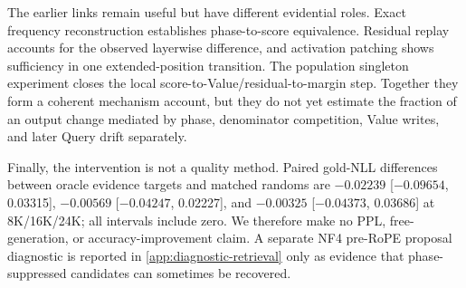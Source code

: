 The earlier links remain useful but have different evidential roles.  Exact
frequency reconstruction establishes phase-to-score equivalence.  Residual
replay accounts for the observed layerwise difference, and activation patching
shows sufficiency in one extended-position transition.  The population
singleton experiment closes the local score-to-Value/residual-to-margin step.
Together they form a coherent mechanism account, but they do not yet estimate
the fraction of an output change mediated by phase, denominator competition,
Value writes, and later Query drift separately.

Finally, the intervention is not a quality method.  Paired gold-NLL differences
between oracle evidence targets and matched randoms are $-0.02239$
[$-0.09654$, 0.03315], $-0.00569$ [$-0.04247$, 0.02227], and $-0.00325$
[$-0.04373$, 0.03686] at 8K/16K/24K; all intervals include zero.  We therefore
make no PPL, free-generation, or accuracy-improvement claim.  A separate NF4
pre-RoPE proposal diagnostic is reported in \cref{app:diagnostic-retrieval}
only as evidence that phase-suppressed candidates can sometimes be recovered.

